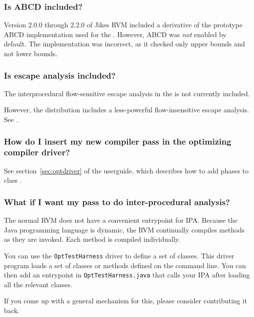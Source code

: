 \subsubsection{Is ABCD included?}
Version 2.0.0 through 2.2.0 of Jikes RVM included a derivative of the
prototype ABCD implementation used for the .  However, ABCD was {\em not} enabled by default.
The implementation was incorrect, as it checked only upper
bounds and not lower bounds. 

\subsubsection{Is escape analysis included?}

The interprocedural flow-sensitive escape analysis in the 
 is not currently included.

However, the distribution includes a less-powerful flow-insensitive
escape analysis.  See  
.

\subsubsection{How do I insert my new compiler pass in the optimizing
compiler driver?}

See section~\ref{sec:optdriver} of the userguide, which describes how to
add phases to class 
.

\subsubsection{What if I want my pass to do inter-procedural analysis?}

The normal RVM does not have a convenient entrypoint for IPA.  Because the
Java programming language is
dynamic, the RVM continually compiles methods as they are
invoked.  Each method is compiled individually.

You can use the {\tt OptTestHarness} driver to define a set of classes. 
This driver program loads a set of classes or methods defined on the
command line.  You can then add an entrypoint in {\tt OptTestHarness.java}
that calls your IPA after loading all the relevant classes.

If you come up with a general mechanism for this, please consider
contributing it back.

